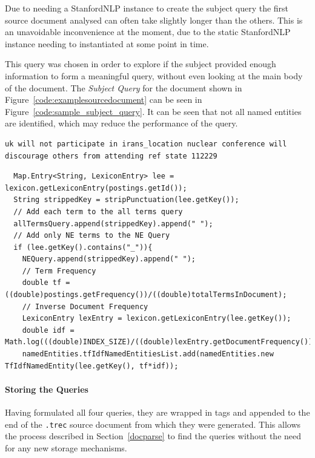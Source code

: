 \documentclass{l4proj}
\newcommand{\code}[1]{\texttt{#1}}
\newenvironment{codelisting}{\captionsetup{type=listing}}{}
\begin{document}
Due to needing a StanfordNLP instance to create the subject query the first source document analysed can often take slightly longer than the others. This is an unavoidable inconvenience at the moment, due to the static StanfordNLP instance needing to instantiated at some point in time.

This query was chosen in order to explore if the subject provided enough information to form a meaningful query, without even looking at the main body of the document. The \textit{Subject Query} for the document shown in Figure~\ref{code:examplesourcedocument} can be seen in Figure~\ref{code:sample_subject_query}. It can be seen that not all named entities are identified, which may reduce the performance of the query.
\begin{codelisting}
\begin{verbatim}
uk will not participate in irans_location nuclear conference will discourage others from attending ref state 112229
\end{verbatim}
\label{code:sample_subject_query}
\end{codelisting}
\begin{codelisting}
\begin{verbatim}
  Map.Entry<String, LexiconEntry> lee = lexicon.getLexiconEntry(postings.getId());
  String strippedKey = stripPunctuation(lee.getKey());
  // Add each term to the all terms query
  allTermsQuery.append(strippedKey).append(" ");
  // Add only NE terms to the NE Query 
  if (lee.getKey().contains("_")){
    NEQuery.append(strippedKey).append(" ");
    // Term Frequency
    double tf = ((double)postings.getFrequency())/((double)totalTermsInDocument);
    // Inverse Document Frequency
    LexiconEntry lexEntry = lexicon.getLexiconEntry(lee.getKey());
    double idf = Math.log(((double)INDEX_SIZE)/((double)lexEntry.getDocumentFrequency()));
    namedEntities.tfIdfNamedEntitiesList.add(namedEntities.new TfIdfNamedEntity(lee.getKey(), tf*idf));
\end{verbatim}
\label{code:query_generation}
\end{codelisting}

\paragraph{Storing the Queries}
Having formulated all four queries, they are wrapped in tags and appended to the end of the \code{.trec} source document from which they were generated. This allows the process described in Section~\ref{docparse} to find the queries without the need for any new storage mechanisms.
\end{document}
